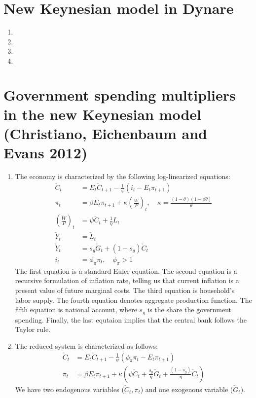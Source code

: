 \documentclass[11pt]{amsart}
\begin{document}
\section{New Keynesian model in Dynare}
\begin{enumerate}[label = (\alph*)]
	\item 
	\item 
	\item 
	\item 
\end{enumerate}
\section{Government spending multipliers in the new Keynesian model (Christiano, Eichenbaum and Evans 2012)}
\begin{enumerate}[label = (\alph*)]
	\item The economy is characterized by the following log-linearized equations:
	\begin{align*}
	 \check { C } _ { t } &= E _ { t } \check { C } _ { t + 1} - \frac { 1} { \psi } \left( i _ { t } - E _ { t } \pi _ { t + 1} \right)  \\ 
	 \pi _ { t } &= \beta E _ { t } \pi _ { t + 1} + \kappa \left( \frac { \check {W} } { P } \right)_t ,\quad \kappa = \frac { ( 1- \theta ) ( 1- \beta \theta ) } { \theta }  \\
	\left( \frac { \check{ W } } { P } \right) _ { t } &= \psi \check { C } _ { t } + \frac { 1} { \eta } L _ { t } \\
	\check { Y } _ { t } &= \check { L } _ { t } \\
	\check{ Y }_t &= s_g \check{G}_t + (1-s_g) \check{ C }_t \\
	i_t &= \phi_\pi \pi_t, \quad \phi_\pi > 1
	\end{align*}
	The first equation is a standard Euler equation. The second equation is a recursive formulation of inflation rate, telling us that current inflation is a present value of future marginal costs. The third equation is household's labor supply. The fourth equation denotes aggregate production function. The fifth equation is national account, where $s_g$ is the share the government spending. Finally, the last equtaion implies that the central bank follows the Taylor rule. 
	
	\item The reduced system is characterized as follows: 
	\begin{align*}
	\check{ C }_t &= E_t \check{ C }_{t+1} - \frac{1}{\psi} \left(\phi_\pi \pi_t - E_t\pi_{t+1} \right) \\
	\pi_t &= \beta E_t \pi_{t+1} + \kappa \left( \psi \check{ C }_t + \frac{s_g}{\eta} \check{ G}_t + \frac{(1-s_g)}{\eta} \check{ C }_t \right)
	\end{align*}
	We have two endogenous variables ($\check{ C }_t, \pi_t$) and one exogenous variable ($\check{ G}_t$). 
	

\end{enumerate}
\end{document}
